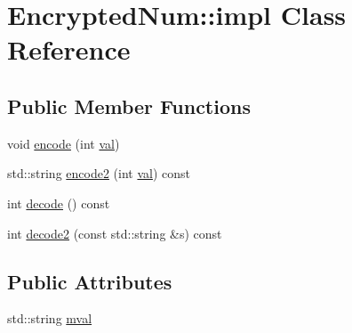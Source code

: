 \hypertarget{class_encrypted_num_1_1impl}{}\section{Encrypted\+Num\+:\+:impl Class Reference}
\label{class_encrypted_num_1_1impl}
\subsection*{Public Member Functions}
\begin{DoxyCompactItemize}
\item 
void \mbox{\hyperlink{class_encrypted_num_1_1impl_ab83894c5282275c278b7c93c67ae014c}{encode}} (int \mbox{\hyperlink{class_encrypted_num_a3cb78d22a4bbb6bd3199bcf10de04366}{val}})
\item 
std\+::string \mbox{\hyperlink{class_encrypted_num_1_1impl_a2ed6b50a7a30e43907180281aadf37f7}{encode2}} (int \mbox{\hyperlink{class_encrypted_num_a3cb78d22a4bbb6bd3199bcf10de04366}{val}}) const
\item 
int \mbox{\hyperlink{class_encrypted_num_1_1impl_acfb8cdcba7ef98973ae0ad981849bb43}{decode}} () const
\item 
int \mbox{\hyperlink{class_encrypted_num_1_1impl_ada1239b7988c4f313262bf2b8ed6a8e9}{decode2}} (const std\+::string \&s) const
\end{DoxyCompactItemize}
\subsection*{Public Attributes}
\begin{DoxyCompactItemize}
\item 
std\+::string \mbox{\hyperlink{class_encrypted_num_1_1impl_a5132feb4824b37424399309ee5db5b64}{mval}}
\end{DoxyCompactItemize}

